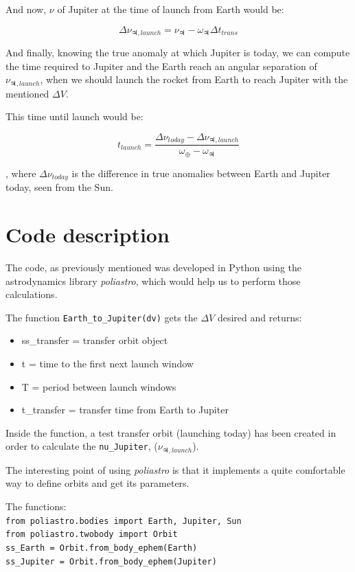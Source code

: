 And now, $\nu$ of Jupiter at the time of launch from Earth would be:

\begin{equation}
	\Delta \nu_{\jupiter, launch} = \nu_{\jupiter} - \omega_{\jupiter} \Delta t_{trans}
\end{equation}

And finally, knowing the true anomaly at which Jupiter is today, we can compute
the time required to Jupiter and the Earth reach an angular separation of
$\nu_{\jupiter, launch}$, when we should launch the rocket from Earth to reach
Jupiter with the mentioned $\Delta V$.

This time until launch would be:

\begin{equation}
	t_{launch} = \frac{\Delta \nu_{today} - \Delta \nu_{\jupiter, launch}}{\omega_{\oplus} - \omega_{\jupiter}}
\end{equation}

, where $\Delta \nu_{today}$ is the difference in true anomalies between Earth
and Jupiter today, seen from the Sun.

\section{Code description}

The code, as previously mentioned was developed in Python using the astrodynamics
library \textit{poliastro}, which would help us to perform those calculations.

The function \texttt{Earth\_to\_Jupiter(dv)} gets the $\Delta V$ desired and
returns:

\begin{itemize}
	\item ss\_transfer = transfer orbit object
	\item t = time to the first next launch window
	\item T = period between launch windows
	\item t\_transfer = transfer time from Earth to Jupiter
\end{itemize}

Inside the function, a test transfer orbit (launching today) has been created in
order to calculate the \texttt{nu\_Jupiter}, ($\nu_{\jupiter, launch}$).

The interesting point of using \textit{poliastro} is that it implements a quite
comfortable way to define orbits and get its parameters.

The functions:\\
\texttt{from poliastro.bodies import Earth, Jupiter, Sun}\\
\texttt{from poliastro.twobody import Orbit}\\
\texttt{ss\_Earth = Orbit.from\_body\_ephem(Earth)}\\
\texttt{ss\_Jupiter = Orbit.from\_body\_ephem(Jupiter)}

